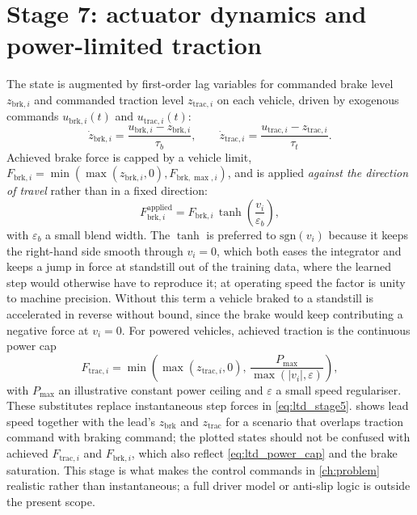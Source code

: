 \section{Stage 7: actuator dynamics and power-limited traction}

The state is augmented by first-order lag variables for commanded brake level $z_{\mathrm{brk},i}$ and commanded traction level $z_{\mathrm{trac},i}$ on each vehicle, driven by exogenous commands $u_{\mathrm{brk},i}(t)$ and $u_{\mathrm{trac},i}(t)$:
\begin{equation}
    \dot{z}_{\mathrm{brk},i} = \frac{u_{\mathrm{brk},i} - z_{\mathrm{brk},i}}{\tau_b}, \qquad
    \dot{z}_{\mathrm{trac},i} = \frac{u_{\mathrm{trac},i} - z_{\mathrm{trac},i}}{\tau_t}.
    \label{eq:ltd_actuator_lag}
\end{equation}
Achieved brake force is capped by a vehicle limit, $F_{\mathrm{brk},i}=\min(\max(z_{\mathrm{brk},i},0),F_{\mathrm{brk},\max,i})$, and is applied \emph{against the direction of travel} rather than in a fixed direction:
\begin{equation}
    F_{\mathrm{brk},i}^{\mathrm{applied}} = F_{\mathrm{brk},i}\,\tanh\!\left(\frac{v_i}{\varepsilon_b}\right),
    \label{eq:ltd_brake_sign}
\end{equation}
with $\varepsilon_b$ a small blend width. The $\tanh$ is preferred to $\mathrm{sgn}(v_i)$ because it keeps the right-hand side smooth through $v_i=0$, which both eases the integrator and keeps a jump in force at standstill out of the training data, where the learned step would otherwise have to reproduce it; at operating speed the factor is unity to machine precision. Without this term a vehicle braked to a standstill is accelerated in reverse without bound, since the brake would keep contributing a negative force at $v_i=0$. For powered vehicles, achieved traction is the continuous power cap
\begin{equation}
    F_{\mathrm{trac},i} = \min\!\left(\max(z_{\mathrm{trac},i},0),\,\frac{P_{\max}}{\max(|v_i|,\varepsilon)}\right),
    \label{eq:ltd_power_cap}
\end{equation}
with $P_{\max}$ an illustrative constant power ceiling and $\varepsilon$ a small speed regulariser. These substitutes replace instantaneous step forces in \cref{eq:ltd_stage5}.  shows lead speed together with the lead's $z_{\mathrm{brk}}$ and $z_{\mathrm{trac}}$ for a scenario that overlaps traction command with braking command; the plotted states should not be confused with achieved $F_{\mathrm{trac},i}$ and $F_{\mathrm{brk},i}$, which also reflect \cref{eq:ltd_power_cap} and the brake saturation. This stage is what makes the control commands in \cref{ch:problem} realistic rather than instantaneous; a full driver model or anti-slip logic is outside the present scope.

